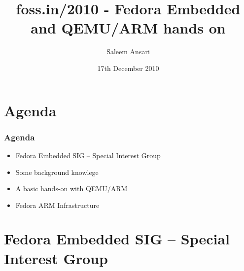 \documentclass[11pt]{beamer}
\institute{Fedora}
\title{foss.in/2010 - Fedora Embedded and QEMU/ARM hands on}
\author{Saleem Ansari}
\date{17th December 2010}
\begin{document}
\maketitle

\setcounter{tocdepth}{3}
\tableofcontents
\vspace*{1cm}


\section{Agenda}
\label{sec-1}


\begin{frame}[fragile]\frametitle{Agenda}
\label{sec-1.1}

\begin{itemize}

\item Fedora Embedded SIG – Special Interest Group\\
\label{sec-1.1.1}


\item Some background knowlege\\
\label{sec-1.1.2}


\item A basic hands-on with QEMU/ARM\\
\label{sec-1.1.3}


\item Fedora ARM Infrastructure\\
\label{sec-1.1.4}


\end{itemize} %
\end{frame}
\section{Fedora Embedded SIG – Special Interest Group}
\label{sec-2}
\end{document}
